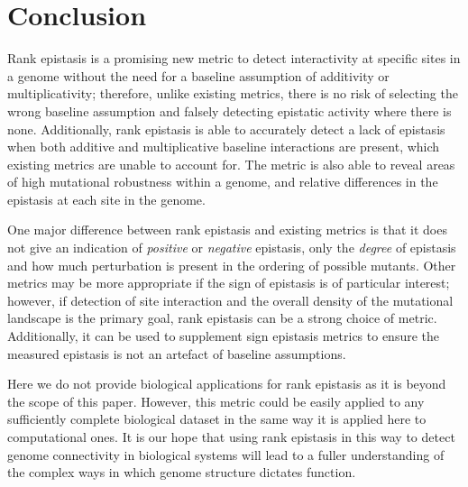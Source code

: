 \section{Conclusion}

Rank epistasis is a promising new metric to detect interactivity at specific sites in a genome without the need for a baseline assumption of additivity or multiplicativity; therefore, unlike existing metrics, there is no risk of selecting the wrong baseline assumption and falsely detecting epistatic activity where there is none. Additionally, rank epistasis is able to accurately detect a lack of epistasis when both additive and multiplicative baseline interactions are present, which existing metrics are unable to account for. The metric is also able to reveal areas of high mutational robustness within a genome, and relative differences in the epistasis at each site in the genome.

One major difference between rank epistasis and existing metrics is that it does not give an indication of \textit{positive} or \textit{negative} epistasis, only the \textit{degree} of epistasis and how much perturbation is present in the ordering of possible mutants. Other metrics may be more appropriate if the sign of epistasis is of particular interest; however, if detection of site interaction and the overall density of the mutational landscape is the primary goal, rank epistasis can be a strong choice of metric. Additionally, it can be used to supplement sign epistasis metrics to ensure the measured epistasis is not an artefact of baseline assumptions.

 Here we do not provide biological applications for rank epistasis as it is beyond the scope of this paper. However, this metric could be easily applied to any sufficiently complete biological dataset in the same way it is applied here to computational ones. It is our hope that using rank epistasis in this way to detect genome connectivity in biological systems will lead to a fuller understanding of the complex ways in which genome structure dictates function.